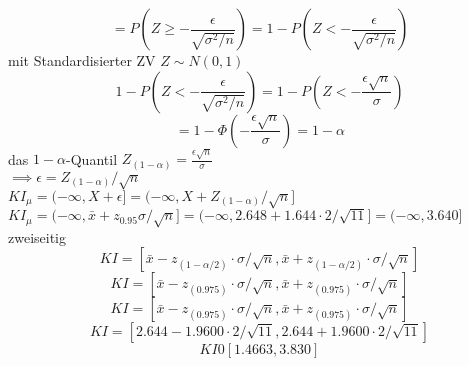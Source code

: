 \documentclass{article}
\begin{document}
	\[= P(Z \geq -\frac{\epsilon}{\sqrt{\sigma^2/n}}) = 1-P(Z < -\frac{\epsilon}{\sqrt{\sigma^2/n}})\]
	mit Standardisierter ZV $Z\sim N(0,1)$\\
	\[ 1-P(Z < -\frac{\epsilon}{\sqrt{\sigma^2/n}}) =  1-P(Z < -\frac{\epsilon\sqrt{n}}{\sigma})\]
	\[= 1-\Phi(-\frac{\epsilon\sqrt{n}}{\sigma}) = 1-\alpha\]
	das $1-\alpha$-Quantil $Z_{(1-\alpha)}=\frac{\epsilon\sqrt{n}}{\sigma}$\\
	$\implies \epsilon = Z_{(1-\alpha)}/\sqrt{n}$\\
	$K I_\mu = (-\infty, X+\epsilon] = (-\infty, X+Z_{(1-\alpha)}/\sqrt{n}]$\\
	$K I_\mu = (-\infty, \bar x + z_{0.95}\sigma/\sqrt{n}] = (-\infty, 2.648 + 1.644\cdot 2/\sqrt{11}] = (-\infty,3.640]$\\
	zweiseitig
	\[K I = [\bar x-z_{(1-\alpha/2)}\cdot\sigma/\sqrt{n},\bar x+z_{(1-\alpha/2)}\cdot\sigma/\sqrt{n}]\]
	\[K I = [\bar x-z_{(0.975)}\cdot\sigma/\sqrt{n},\bar x+z_{(0.975)}\cdot\sigma/\sqrt{n}]\]
	\[K I = [\bar x-z_{(0.975)}\cdot\sigma/\sqrt{n},\bar x+z_{(0.975)}\cdot\sigma/\sqrt{n}]\]
	\[K I = [2.644-1.9600\cdot2/\sqrt{11},2.644+1.9600\cdot2/\sqrt{11}]\]
	\[K I 0 [1.4663,3.830]\]
\end{document}

